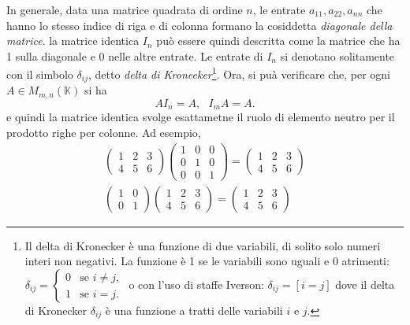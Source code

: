 \begin{osservazione}
  In generale, data una matrice quadrata di ordine $n$, le entrate $a_{11}, a_{22}, a_{nn}$ che
  hanno lo stesso indice di riga e di colonna formano la cosiddetta \textit{diagonale della
    matrice}. la matrice identica $I_n$ può essere quindi descritta come la matrice che ha 1
  sulla diagonale e 0 nelle altre entrate. Le entrate di $I_n$ si denotano solitamente con il
  simbolo $\delta_{ij}$, detto \textit{delta di Kroneeker}\footnote{Il delta di Kronecker è una
    funzione di due variabili, di solito solo numeri interi non negativi. La funzione è 1 se le
    variabili sono uguali e 0 atrimenti: $\delta_{ij}=
    \begin{cases}
      0 & \text{se } i\neq j,\\
      1 & \text{se } i = j.
    \end{cases}$ o con l'uso di staffe Iverson: $\delta_{ij}=[i=j]$ dove il delta di Kronecker
    $\delta_{ij}$ è una funzione a tratti delle variabili $i$ e $j$.}.
  Ora, si puà verificare che, per ogni $A\in M_{m,n}(\mathbb{K})$ si ha
  \begin{equation*}
    AI_n=A, \text{ } I_mA=A.
  \end{equation*}
  e quindi la matrice identica svolge esattametne il ruolo di elemento neutro per il prodotto
  righe per colonne. Ad esempio,
  \begin{eqnarray*}
    \begin{pmatrix}
      1 &2&3\\
      4 &5 & 6
    \end{pmatrix}  \begin{pmatrix}
      1 &0&0\\
      0&1&0\\
      0&0&1
                   \end{pmatrix}
    =
    \begin{pmatrix}
      1 & 2& 3\\
      4 & 5 & 6
    \end{pmatrix}\\
    \begin{pmatrix}
      1 &0\\
      0 &1
    \end{pmatrix} 
    \begin{pmatrix}
      1 & 2& 3\\
      4 & 5 & 6
    \end{pmatrix}=
    \begin{pmatrix}
      1 & 2& 3\\
      4 & 5 & 6
    \end{pmatrix}
  \end{eqnarray*}
\end{osservazione}
